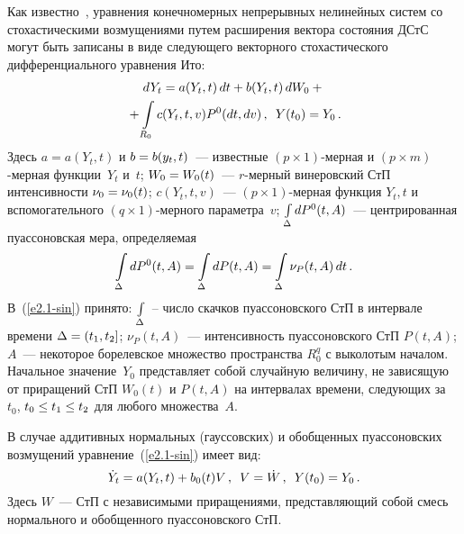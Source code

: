 \begin{multicols}{2}
Как известно~\cite{2-sin, 3-sin},  уравнения конечномерных непрерывных нелинейных сис\-тем
со стохастическими возмущениями путем расширения вектора состояния ДСтС
могут быть записаны в виде следующего векторного стохастического
дифференциального уравнения Ито:
    \begin{multline}
    dY_t = a(Y_t, t)\, dt + b (Y_t, t) \,dW_0+{}\\
    {}+ \int\limits_{R_0} c (Y_t, t, v) P^0
    (dt, dv)\,,\enskip Y(t_0) = Y_0\,.\label{e2.1-sin}
    \end{multline}
Здесь $a=a(Y_t, t)$ и $b\hm=b(y_t, t)$~--- известные
$(p\times 1)$-мер\-ная и  $(p\times m)$-мер\-ная функции~$Y_t$ и~$t$;
$W_0\hm= W_0(t)$~--- $r$-мер\-ный винеровский СтП интенсивности
$\nu_0 \hm= \nu_0(t)$; $c(Y_t, t, v)$~--- $(p\times 1)$-мер\-ная функция  $Y_t, t$
и вспомогательного $(q\times 1)$-мер\-но\-го па\-ра\-мет\-ра~$v$;
$\int\limits_{\Delta} dP^0 (t, A)$~--- центрированная пуассоновская мера,
определяемая
\begin{equation*}
\iii_{\Delta} dP^0 (t, A) = \iii_{\Delta} dP (t,A) =
\iii_{\Delta} \nu_P (t,A)\, dt\,. %
\end{equation*}
В~(\ref{e2.1-sin}) принято: $\int\limits_{\Delta}$~-- число скачков пуассоновского
СтП в интервале времени  $\Delta \hm= (t_1, t_2]$; $\nu_P (t, A)$~---
интенсивность пуассоновского СтП  $P(t,A)$; $A$~--- некоторое борелевское
множество пространства  $R_0^q$ с выколотым началом.
Начальное значение~$Y_0$ представляет собой случайную величину, не зависящую
от приращений СтП  $W_0(t)$ и $P(t,A)$ на интервалах времени, следующих
за~$t_0$, $t_0 \hm\le t_1\hm\le t_2$ для любого множества~$A$.

В случае аддитивных нормальных (гауссовских) и обобщенных
пуассоновских возмущений уравнение~(\ref{e2.1-sin}) имеет вид:
\begin{equation}
\dot Y_t = a(Y_t,t)+ b_0 (t) V\,, \enskip
V = \dot W\,,\enskip Y(t_0) = Y_0\,.\label{e2.3-sin}
\end{equation}
Здесь $W$~--- СтП с независимыми приращениями, представляющий собой
смесь нормального и обобщенного пуассоновского СтП.


\end{multicols}
